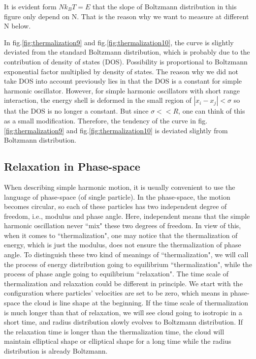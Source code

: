 \documentclass[aps,pre,twocolumn,groupedaddress]{revtex4-1}
\begin{document}
It is evident form $Nk_BT=E$ that the slope of Boltzmann distribution in this figure only depend on N. That is the reason why we want to measure at different N below. 

In fig.\ref{fig:thermalization9} and fig.\ref{fig:thermalization10}, the curve is slightly deviated from the standard Boltzmann distribution, which is probably due to the contribution of density of states (DOS). Possibility is proportional to Boltzmann exponential factor multiplied by density of states. The reason why we did not take DOS into account previously lies in that the DOS is a constant for simple harmonic oscillator. However, for simple harmonic oscillators with short range interaction, the energy shell is deformed in the small region of $|x_i-x_j|<\sigma$ so that the DOS is no longer a constant. But since $\sigma<<R$, one can think of this as a small modification. Therefore, the tendency of the curve in fig.\ref{fig:thermalization9} and fig.\ref{fig:thermalization10} is deviated slightly from Boltzmann distribution.
 


\subsection{Relaxation in Phase-space}

When describing simple harmonic motion, it is usually convenient to use the language of phase-space (of single particle). In the phase-space, the motion becomes circular, so each of these particles has two independent degree of freedom, i.e., modulus and phase angle. Here, independent means that the simple harmonic oscillation never ``mix" these two degrees of freedom. In view of this, when it comes to ``thermalization", one may notice that the thermalization of energy, which is just the modulus, does not ensure the thermalization of phase angle. To distinguish these two kind of meanings of ``thermalization", we will call the process of energy distribution going to equilibrium ``thermalization", while the process of phase angle going to equilibrium ``relaxation". The time scale of thermalization and relaxation could be different in principle. We start with the configuration where particles' velocities are set to be zero, which means in phase-space the cloud is line shape at the beginning. If the time scale of thermalization is much longer than that of relaxation, we will see cloud going to isotropic in a short time, and radius distribution slowly evolves to Boltzmann distribution. If the relaxation time is longer than the thermalization time, the cloud will maintain elliptical shape or elliptical shape for a long time while the radius distribution is already Boltzmann.
\end{document}
